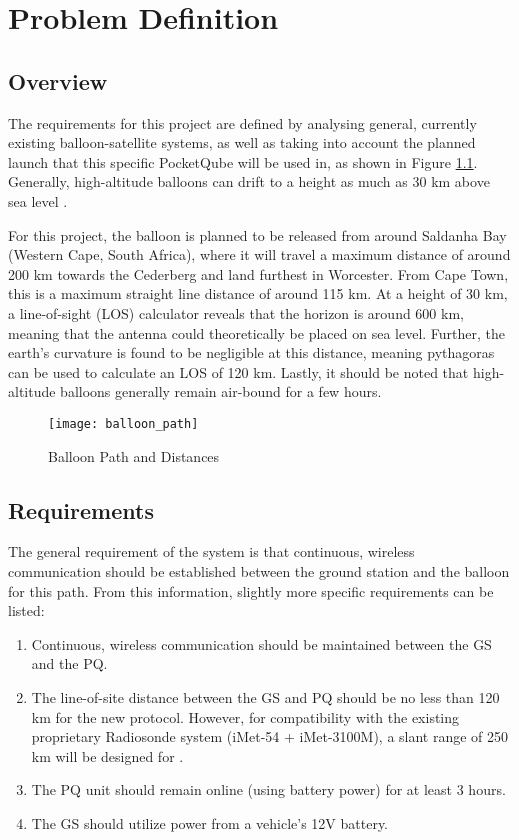 \graphicspath{{content/figures}}

\chapter{Problem Definition}

\section{Overview}

The requirements for this project are defined by analysing general, currently existing balloon-satellite systems, as well as taking into account the planned launch that this specific \mbox{PocketQube} will be used in, as shown in Figure \ref{fig:balloon_path}. Generally, high-altitude balloons can drift to a height as much as 30 km above sea level \cite{weatherWeatherBalloons}.

For this project, the balloon is planned to be released from around Saldanha Bay (Western Cape, South Africa), where it will travel a maximum distance of around 200 km towards the Cederberg and land furthest in Worcester. From Cape Town, this is a maximum straight line distance of around 115 km. At a height of 30 km, a line-of-sight (LOS) calculator reveals that the horizon is around 600 km, meaning that the antenna could theoretically be placed on sea level. Further, the earth's curvature is found to be negligible at this distance, meaning pythagoras can be used to calculate an LOS of 120 km. Lastly, it should be noted that high-altitude balloons generally remain air-bound for a few hours.

\begin{figure}[!htb]
  \centering
  \texttt{[image: balloon\_path]}
  \caption{Balloon Path and Distances}
  \label{fig:balloon_path}
\end{figure}


\section{Requirements}

The general requirement of the system is that continuous, wireless communication should be established between the ground station and the balloon for this path. From this information, slightly more specific requirements can be listed:
\begin{enumerate}
    \item Continuous, wireless communication should be maintained between the GS and the PQ.
    \item The line-of-site distance between the GS and PQ should be no less than 120 km for the new protocol. However, for compatibility with the existing proprietary Radiosonde system (iMet-54 + iMet-3100M), a slant range of 250 km will be designed for \cite{datasheet-iMet3100M}.
    \item The PQ unit should remain online (using battery power) for at least 3 hours.
    \item The GS should utilize power from a vehicle's 12V battery.
\end{enumerate}


